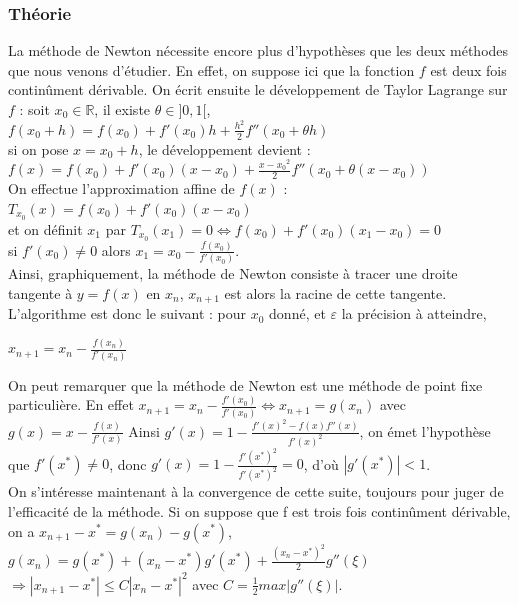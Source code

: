 \documentclass[a4paper,10pt]{report}
\begin{document}
\subsubsection{Théorie}
La méthode de Newton nécessite encore plus d'hypothèses que les deux méthodes que nous venons d'étudier. En effet, on suppose ici que la fonction $f$ est deux fois continûment dérivable. On écrit ensuite le développement de Taylor Lagrange sur $f$ : soit $x_{0}\in\mathbb{R}$, il existe $\theta\in]0,1[$,\\
$f(x_0+h)=f(x_0)+f'(x_0)h + \frac{h^2}{2}f''(x_0+\theta h)$\\
si on pose $x=x_0+h$, le développement devient :\\
$f(x)=f(x_0)+f'(x_0)(x-x_0) + \frac{{x-x_0}^2}{2}f''(x_0+\theta (x-x_0))$\\
On effectue l'approximation affine de $f(x)$ : $T_{x_0}(x)=f(x_0)+f'(x_0)(x-x_0)$\\
et on définit $x_1$ par $T_{x_0}(x_1)=0 \Leftrightarrow f(x_0)+f'(x_0)(x_1-x_0)=0$\\
si $f'(x_0)\neq0$ alors $x_1=x_0 - \frac{f(x_0)}{f'(x_0)}$.\\
Ainsi, graphiquement, la méthode de Newton consiste à tracer une droite tangente à $y=f(x)$ en $x_n$, $x_{n+1}$ est alors la racine de cette tangente.\\
\indent L'algorithme est donc le suivant : pour $x_0$ donné, et $\varepsilon$ la précision à atteindre,
\begin{algorithm}
\begin{algorithmic}
\STATE $x_{n+1} =  x_{n}-\frac{f(x_n)}{f'(x_n)}$
\ENDWHILE
\end{algorithmic}
\end{algorithm}

\indent On peut remarquer que la méthode de Newton est une méthode de point fixe particulière.
En effet $x_{n+1}=x_n-\frac{f'(x_0)}{f'(x_0)} \Leftrightarrow x_{n+1}=g(x_n)$ avec $g(x)=x-\frac{f(x)}{f'(x)}$
Ainsi $g'(x)=1-\frac{f'(x)^2-f(x)f''(x)}{f'(x)^2}$, on émet l'hypothèse que $f'(x^*)\neq0$, donc $g'(x)=1-\frac{f'(x^*)^2}{f'(x^*)^2} = 0$, d'où $|g'(x^*)|<1$.\\
\indent On s'intéresse maintenant à la convergence de cette suite, toujours pour juger de l'efficacité de la méthode. Si on suppose que f est trois fois continûment dérivable, on a $x_{n+1}-x^*=g(x_n)-g(x^*)$, $g(x_n)=g(x^*)+(x_n-x^*)g'(x^*)+\frac{(x_n-x^*)^2}{2}g''(\xi)$ $\Rightarrow |x_{n+1}-x^*|\leq C|x_n-x^*|^2$ avec $C=\frac{1}{2}max|g''(\xi)|$.
\end{document}
